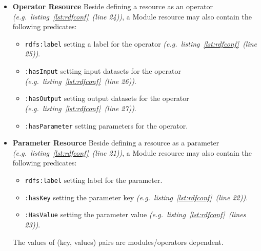 \documentclass[a4paper,twoside,bibtotoc,abstracton,12pt,BCOR=15mm]{article}
\begin{document}
\begin{itemize}
  \item \textbf{Operator Resource}
    Beside defining a resource as an operator \emph{(e.g.~listing~\ref{lst:rdfconf}~(line 24))},
    a Module resource may also contain the following predicates:
    \begin{itemize}
	\item \texttt{rdfs:label} setting a label for the operator \emph{(e.g.~listing~\ref{lst:rdfconf}~(line 25))}.
	\item \texttt{:hasInput} setting input datasets for the operator \emph{(e.g.~listing~\ref{lst:rdfconf}~(line 26))}.
	\item \texttt{:hasOutput} setting output datasets for the operator \emph{(e.g.~listing~\ref{lst:rdfconf}~(line 27))}.
	\item \texttt{:hasParameter} setting parameters for the operator.
    \end{itemize}

  \item \textbf{Parameter Resource}
    Beside defining a resource as a parameter \emph{(e.g.~listing~\ref{lst:rdfconf}~(line 21))},
    a Module resource may also contain the following predicates:
    \begin{itemize}
	\item \texttt{rdfs:label} setting label for the parameter.
	\item \texttt{:hasKey} setting the parameter key \emph{(e.g.~listing~\ref{lst:rdfconf}~(line 22))}.
	\item \texttt{:HasValue} setting the parameter value \emph{(e.g.~listing~\ref{lst:rdfconf}~(lines 23))}.
    \end{itemize}
    The values of (key, values) pairs are modules/operators dependent.
    
\end{itemize}
\end{document}
